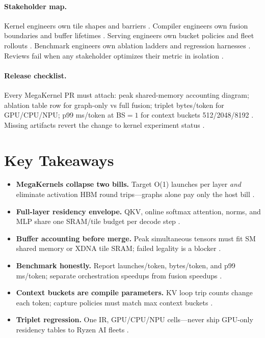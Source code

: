 \paragraph{Stakeholder map.} Kernel engineers own tile shapes and barriers \citep{semianalysis2024tma,nvidia2022hopper}. Compiler engineers own fusion boundaries and buffer lifetimes \citep{yirage2026,chen2020compilerbasedhardw}. Serving engineers own bucket policies and fleet rollouts \citep{kwon2023vllm,patel2025llminference}. Benchmark engineers own ablation ladders and regression harnesses \citep{taxbreak2026,memoryfloor2026}. Reviews fail when any stakeholder optimizes their metric in isolation \citep{liu2024deepseekv3,dao2022flashattention,dao2023flashdecoding,dlbook,amd2024xdna,amd2024aie,nvidia2024cudagraphs}.


\paragraph{Release checklist.} Every MegaKernel PR must attach: peak shared-memory accounting diagram; ablation table row for graph-only vs full fusion; triplet bytes/token for GPU/CPU/NPU; p99 ms/token at BS${=}1$ for context buckets 512/2048/8192 \citep{taxbreak2026,memoryfloor2026,patel2025llminference,yirage2026,chen2020compilerbasedhardw,amd2024aie,semianalysis2024tma,dao2022flashattention,liu2024deepseekv3,kwon2023vllm,nvidia2024cudagraphs,amd2024xdna,dlbook,dao2023flashdecoding}. Missing artifacts revert the change to kernel experiment status \citep{yirage2026,taxbreak2026}.
\section{Key Takeaways}
\label{sec:ch11_key_takeaways}

\begin{itemize}
\item \textbf{MegaKernels collapse two bills.} Target O(1) launches per layer \emph{and} eliminate activation HBM round trips---graphs alone pay only the host bill \citep{taxbreak2026,memoryfloor2026,nvidia2024cudagraphs}.
\item \textbf{Full-layer residency envelope.} QKV, online softmax attention, norms, and MLP share one SRAM/tile budget per decode step \citep{dao2022flashattention,semianalysis2024tma,yirage2026}.
\item \textbf{Buffer accounting before merge.} Peak simultaneous tensors must fit SM shared memory or XDNA tile SRAM; failed legality is a blocker \citep{amd2024aie,chen2020compilerbasedhardw}.
\item \textbf{Benchmark honestly.} Report launches/token, bytes/token, and p99 ms/token; separate orchestration speedups from fusion speedups \citep{patel2025llminference,taxbreak2026}.
\item \textbf{Context buckets are compile parameters.} KV loop trip counts change each token; capture policies must match max context buckets \citep{kwon2023vllm,nvidia2024cudagraphs,dao2023flashdecoding}.
\item \textbf{Triplet regression.} One IR, GPU/CPU/NPU cells---never ship GPU-only residency tables to Ryzen AI fleets \citep{amd2024xdna,yirage2026,dlbook}.
\end{itemize}

